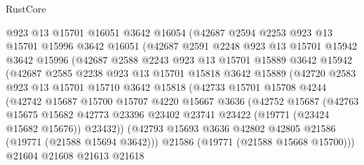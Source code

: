 \begin{lexlean}{RustCore}
\begin{coremodule}
              @923
              @13
              @15701
              @16051
              @3642
              @16054
              (@42687
                @2594
                @2253
                @923
                @13
                @15701
                @15996
                @3642
                @16051
                (@42687
                  @2591
                  @2248
                  @923
                  @13
                  @15701
                  @15942
                  @3642
                  @15996
                  (@42687
                    @2588
                    @2243
                    @923
                    @13
                    @15701
                    @15889
                    @3642
                    @15942
                    (@42687
                      @2585
                      @2238
                      @923
                      @13
                      @15701
                      @15818
                      @3642
                      @15889
                      (@42720
                        @2583
                        @923
                        @13
                        @15701
                        @15710
                        @3642
                        @15818
                        (@42733
                          @15701
                          @15708
                          @4244
                          (@42742
                            @15687
                            @15700
                            @15707
                            @4220
                            @15667
                            @3636
                            (@42752
                              @15687
                              (@42763
                                @15675
                                @15682
                                @42773
                                @23396
                                @23402
                                @23741
                                @23422
                                (@19771 (@23424 @15682 @15676))
                                @23432))
                            (@42793
                              @15693
                              @3636
                              @42802
                              @42805
                              @21586
                              (@19771 (@21588 @15694 @3642)))
                            @21586
                            (@19771 (@21588 @15668 @15700)))
                          @21604
                          @21608
                          @21613
                          @21618

\end{coremodule}
\end{lexlean}
